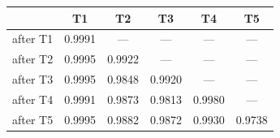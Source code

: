 \begin{tabular}{@{}lccccc@{}}
\toprule
& \textbf{T1} & \textbf{T2} & \textbf{T3} & \textbf{T4} & \textbf{T5} \\
\midrule
after T1 & 0.9991 & --- & --- & --- & --- \\
after T2 & 0.9995 & 0.9922 & --- & --- & --- \\
after T3 & 0.9995 & 0.9848 & 0.9920 & --- & --- \\
after T4 & 0.9991 & 0.9873 & 0.9813 & 0.9980 & --- \\
after T5 & 0.9995 & 0.9882 & 0.9872 & 0.9930 & 0.9738 \\
\bottomrule
\end{tabular}
